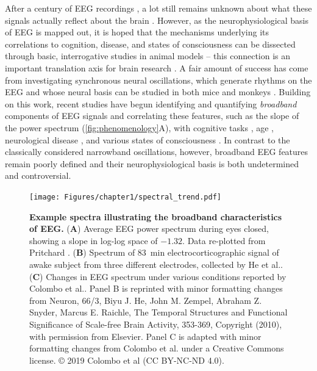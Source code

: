 After a century of EEG recordings \cite{Berger1929}, a lot still remains unknown about what these signals actually reflect about the brain \cite{Cohen2017}. However, as the neurophysiological basis of EEG is mapped out, it is hoped that the mechanisms underlying its correlations to cognition, disease, and states of consciousness can be dissected through basic, interrogative studies in animal models -- this connection is an important translation axis for brain research \cite{da2013eeg}. A fair amount of success has come from investigating synchronous neural oscillations, which generate rhythms on the EEG and whose neural basis can be studied in both mice and monkeys \cite{Buzsaki2004}. Building on this work, recent studies have begun identifying and quantifying \textit{broadband} components of EEG signals and correlating these features, such as the slope of the power spectrum (\autoref{fig:phenomenology}A), with cognitive tasks \cite{Ouyang2020,Podvalny2015,He2010,Waschke2021}, age \cite{Voytek2015}, neurological disease \cite{Wang2022, Pertermann2019, Schaworonkow2021, OSTLUND2021100931, MOLINA2020562, Robertson2019, Roche2019}, and various states of consciousness \cite{Colombo2019, Stock2020, Lendner2020, MUTHUKUMARASWAMY2018582}. In contrast to the classically considered narrowband oscillations, however, broadband EEG features remain poorly defined and their neurophysiological basis is both undetermined and controversial. 

\begin{figure}[b!]
    \centering
    \texttt{[image: Figures/chapter1/spectral\_trend.pdf]}
    
    \caption{\textbf{Example spectra illustrating the broadband characteristics of EEG.} 
    (\textbf{A}) Average EEG power spectrum during eyes closed, showing a slope in log-log space of $-1.32$. Data re-plotted from Pritchard \cite{Pritchard1992}. (\textbf{B}) Spectrum of \qty{83}{\minute} electrocorticographic signal of awake subject from three different electrodes, collected by He et al.\cite{He2010}.  (\textbf{C}) Changes in EEG spectrum under various conditions reported by Colombo et al.\cite{Colombo2019}. Panel B is reprinted with minor formatting changes from Neuron, 66/3, Biyu J. He, John M. Zempel, Abraham Z. Snyder, Marcus E. Raichle, The Temporal Structures and Functional Significance of Scale-free Brain Activity, 353-369, Copyright (2010), with permission from Elsevier. Panel C is adapted with minor formatting changes from Colombo et al. \cite{Colombo2019} under a Creative Commons license. © 2019 Colombo et al (CC BY-NC-ND 4.0).
    } 
    \label{fig:phenomenology}
\end{figure}

